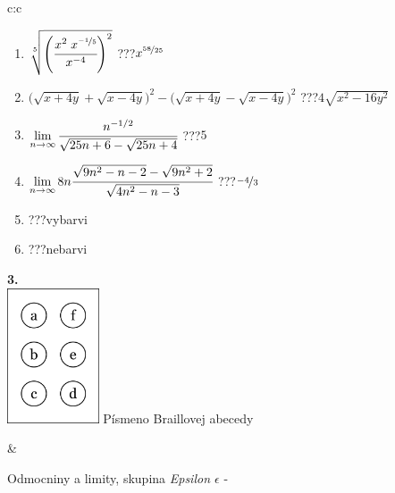 \documentclass[10pt]{report}
\begin{document}
\begin{tabular}{c:c}
\begin{minipage}[c][104.5mm][t]{0.5\linewidth}
\begin{center}
\begin{minipage}{0.79\linewidth}
\begin{center}
\begin{varwidth}{\linewidth}
\begin{enumerate}
\small
\item $\sqrt[5]{\left(\cfrac{x^{2}\;x^{\nicefrac{-1}{5}}}{x^{-4}}\right)^{2}}$\quad \dotfill\; ???\;\dotfill \quad $x^{\nicefrac{58}{25}}$
\item {\footnotesize{\scriptsize$\big(\sqrt{x+4y}+\sqrt{x-4y}\big)^2-\big(\sqrt{x+4y}-\sqrt{x-4y}\big)^2$}\quad \dotfill\; ???\;\dotfill \quad $4\sqrt{x^2-16y^2}$}
\item $\lim\limits_{n\to\infty}\cfrac{n^{-1/2}}{\sqrt{25n+6}-\sqrt{25n+4}}$\quad \dotfill\; ???\;\dotfill \quad $5$
\item $\lim\limits_{n\to\infty}8n\cfrac{\sqrt{9n^2-n-2}-\sqrt{9n^2+2}}{\sqrt{4n^2-n-3}}$\quad \dotfill\; ???\;\dotfill \quad $\nicefrac{-4}{3}$
\item \quad \dotfill\; ???\;\dotfill \quad vybarvi
\item \quad \dotfill\; ???\;\dotfill \quad nebarvi
\end{enumerate}
\end{varwidth}
\end{center}
\end{minipage}
\begin{minipage}{0.20\linewidth}
\begin{center}
{\Huge\bfseries 3.} \\[2mm]
\includegraphics[height=40mm]{../images/braille.png}
{\small Písmeno Braillovej abecedy}
\end{center}
\end{minipage}
\end{center}
\end{minipage}
&
\begin{minipage}[c][104.5mm][t]{0.5\linewidth}
\begin{center}
\vspace{7mm}
{\huge Odmocniny a limity, skupina \textit{Epsilon $\epsilon$} -}\\[5mm]

\end{center}
\end{minipage}
\end{tabular}
\end{document}
